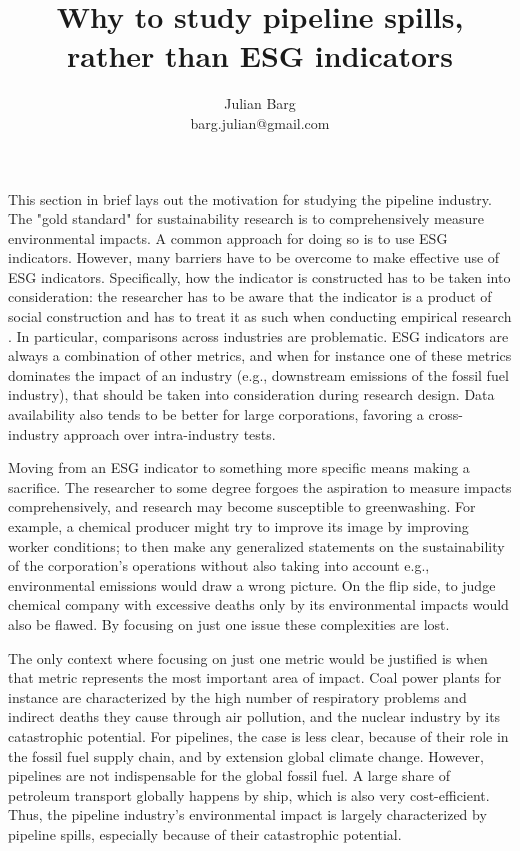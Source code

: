\documentclass[12pt, man, natbib]{apa6}
\title{Why to study pipeline spills, rather than ESG indicators}
\author{Julian Barg\\barg.julian@gmail.com}
\affiliation{Ivey Business School}
\begin{document}
	
	\maketitle
	
	\singlespacing
	
	\section{}	
	
	This section in brief lays out the motivation for studying the pipeline industry. The "gold standard" for sustainability research is to comprehensively measure environmental impacts. A common approach for doing so is to use ESG indicators. However, many barriers have to be overcome to make effective use of ESG indicators. Specifically, how the indicator is constructed has to be taken into consideration: the researcher has to be aware that the indicator is a product of social construction and has to treat it as such when conducting empirical research \citep{Eccles2019}. In particular, comparisons across industries are problematic. ESG indicators are always a combination of other metrics, and when for instance one of these metrics dominates the impact of an industry (e.g., downstream emissions of the fossil fuel industry), that should be taken into consideration during research design. Data availability also tends to be better for large corporations, favoring a cross-industry approach over intra-industry tests.
	
	Moving from an ESG indicator to something more specific means making a sacrifice. The researcher to some degree forgoes the aspiration to measure impacts comprehensively, and research may become susceptible to greenwashing. For example, a chemical producer might try to improve its image by improving worker conditions; to then make any generalized statements on the sustainability of the corporation's operations without also taking into account e.g., environmental emissions would draw a wrong picture. On the flip side, to judge chemical company with excessive deaths only by its environmental impacts would also be flawed. By focusing on just one issue these complexities are lost.
	
	The only context where focusing on just one metric would be justified is when that metric represents the most important area of impact. Coal power plants for instance are characterized by the high number of respiratory problems and indirect deaths they cause through air pollution, and the nuclear industry by its catastrophic potential. For pipelines, the case is less clear, because of their role in the fossil fuel supply chain, and by extension global climate change. However, pipelines are not indispensable for the global fossil fuel. A large share of petroleum transport globally happens by ship, which is also very cost-efficient. Thus, the pipeline industry's environmental impact is largely characterized by pipeline spills, especially because of their catastrophic potential.
	
\end{document}
